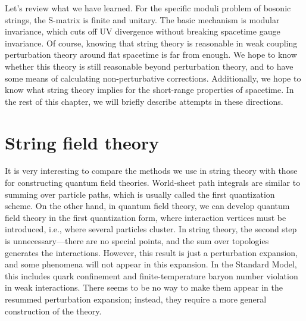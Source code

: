 Let's review what we have learned. For the specific moduli problem of bosonic strings, the S-matrix is finite and unitary. The basic mechanism is modular invariance, which cuts off UV divergence without breaking spacetime gauge invariance. 
Of course, knowing that string theory is reasonable in weak coupling perturbation theory around flat spacetime is far from enough.
We hope to know whether this theory is still reasonable beyond perturbation theory, and to have some means of calculating non-perturbative corrections. 
Additionally, we hope to know what string theory implies for the short-range properties of spacetime. In the rest of this chapter, we will briefly describe attempts in these directions.

\section{String field theory} \label{sec:9.6}

It is very interesting to compare the methods we use in string theory with those for constructing quantum field theories. World-sheet path integrals are similar to summing over particle paths, which is usually called the first quantization scheme. On the other hand, in quantum field theory, we can develop quantum field theory in the first quantization form, where interaction vertices must be introduced, i.e., where several particles cluster.
In string theory, the second step is unnecessary—there are no special points, and the sum over topologies generates the interactions. 
However, this result is just a perturbation expansion, and some phenomena will not appear in this expansion. In the Standard Model, this includes quark confinement and finite-temperature baryon number violation in weak interactions. 
There seems to be no way to make them appear in the resummed perturbation expansion; instead, they require a more general construction of the theory.

